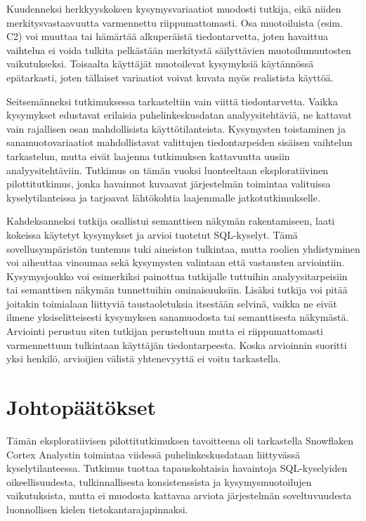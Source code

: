 Kuudenneksi herkkyyskokeen kysymysvariaatiot muodosti tutkija, eikä
niiden merkitysvastaavuutta varmennettu riippumattomasti. Osa
muotoiluista (esim. C2) voi muuttaa tai hämärtää alkuperäistä
tiedontarvetta, joten havaittua vaihtelua ei voida tulkita pelkästään
merkitystä säilyttävien muotoilumuutosten vaikutukseksi.
Toisaalta käyttäjät muotoilevat kysymyksiä käytännössä epätarkasti, joten
tällaiset variaatiot voivat kuvata myös realistista käyttöä.

Seitsemänneksi tutkimuksessa tarkasteltiin vain viittä tiedontarvetta.
Vaikka kysymykset edustavat erilaisia puhelinkeskusdatan
analyysitehtäviä, ne kattavat vain rajallisen osan mahdollisista
käyttötilanteista. Kysymysten toistaminen ja sanamuotovariaatiot
mahdollistavat valittujen tiedontarpeiden sisäisen vaihtelun
tarkastelun, mutta eivät laajenna tutkimuksen kattavuutta uusiin
analyysitehtäviin. Tutkimus on tämän vuoksi luonteeltaan
eksploratiivinen pilottitutkimus, jonka havainnot kuvaavat
järjestelmän toimintaa valituissa kyselytilanteissa ja tarjoavat
lähtökohtia laajemmalle jatkotutkimukselle.

Kahdeksanneksi tutkija osallistui semanttisen näkymän rakentamiseen,
laati kokeissa käytetyt kysymykset ja arvioi tuotetut SQL-kyselyt.
Tämä sovellusympäristön tuntemus tuki aineiston tulkintaa, mutta
roolien yhdistyminen voi aiheuttaa vinoumaa sekä kysymysten valintaan
että vastausten arviointiin. Kysymysjoukko voi esimerkiksi painottua
tutkijalle tuttuihin analyysitarpeisiin tai semanttisen näkymän
tunnettuihin ominaisuuksiin. Lisäksi tutkija voi pitää joitakin
toimialaan liittyviä taustaoletuksia itsestään selvinä, vaikka ne eivät
ilmene yksiselitteisesti kysymyksen sanamuodosta tai semanttisesta
näkymästä. Arviointi perustuu siten tutkijan perusteltuun mutta ei
riippumattomasti varmennettuun tulkintaan käyttäjän tiedontarpeesta.
Koska arvioinnin suoritti yksi henkilö, arvioijien välistä
yhtenevyyttä ei voitu tarkastella.

\section{Johtopäätökset}\label{sec:conclusions}

Tämän eksploratiivisen pilottitutkimuksen tavoitteena oli
tarkastella Snowflaken Cortex Analystin toimintaa viidessä
puhelinkeskusdataan liittyvässä kyselytilanteessa. Tutkimus
tuottaa tapauskohtaisia havaintoja SQL-kyselyiden
oikeellisuudesta, tulkinnallisesta konsistenssista ja
kysymysmuotoilujen vaikutuksista, mutta ei muodosta kattavaa
arviota järjestelmän soveltuvuudesta luonnollisen kielen
tietokantarajapinnaksi.

